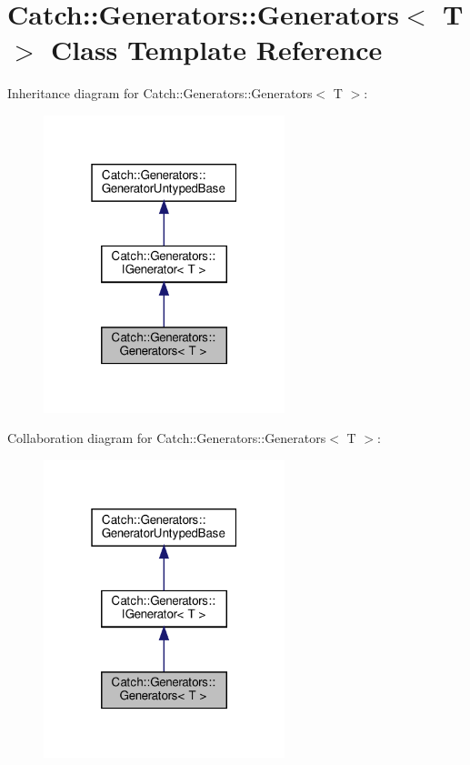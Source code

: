 \hypertarget{classCatch_1_1Generators_1_1Generators}{}\section{Catch\+:\+:Generators\+:\+:Generators$<$ T $>$ Class Template Reference}
\label{classCatch_1_1Generators_1_1Generators}


Inheritance diagram for Catch\+:\+:Generators\+:\+:Generators$<$ T $>$\+:
\nopagebreak
\begin{figure}[H]
\begin{center}
\leavevmode
\includegraphics[width=199pt]{classCatch_1_1Generators_1_1Generators__inherit__graph}
\end{center}
\end{figure}


Collaboration diagram for Catch\+:\+:Generators\+:\+:Generators$<$ T $>$\+:
\nopagebreak
\begin{figure}[H]
\begin{center}
\leavevmode
\includegraphics[width=199pt]{classCatch_1_1Generators_1_1Generators__coll__graph}
\end{center}
\end{figure}
